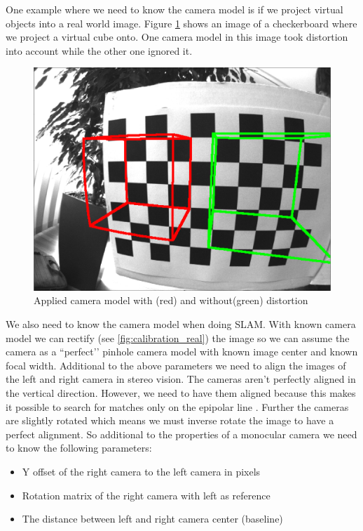 \documentclass[11pt,a4paper,titlepage,oneside]{report}
\begin{document}
One example where we need to know the camera model is if we project virtual objects into a real world image. Figure \ref{fig:model} shows an image of a checkerboard where we project a virtual cube onto. One camera model in this image took distortion into account while the other one ignored it.
\begin{figure}[H]
  \begin{center}
		\includegraphics[width=1.0\textwidth]{img/model.png}
  \end{center}
	\caption{Applied camera model with (red) and without(green) distortion}\label{fig:model}
\end{figure}

We also need to know the camera model when doing SLAM. With known camera model we can rectify (see \ref{fig:calibration_real}) the image so we can assume the camera as a ``perfect’’ pinhole camera model with known image center and known focal width. Additional to the above parameters we need to align the images of the left and right camera in stereo vision. The cameras aren’t perfectly aligned in the vertical direction. However, we need to have them aligned because this makes it possible to search for matches only on the epipolar line \cite{mvg}. Further the cameras are slightly rotated which means we must inverse rotate the image to have a perfect alignment. So additional to the properties of a monocular camera we need to know the following parameters:
\begin{itemize}
	\item Y offset of the right camera to the left camera in pixels
	\item Rotation matrix of the right camera with left as reference
	\item The distance between left and right camera center (baseline)
\end{itemize}
\end{document}
